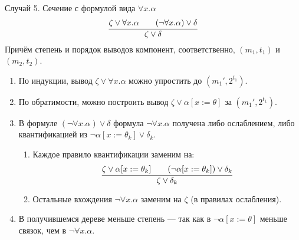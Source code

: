 \documentclass[handout]{beamer}
\begin{document}
\begin{frame}{Случай 5. Сечение с формулой вида $\forall x.\alpha$}
\vspace{-0.1cm}$$\infer{\zeta\vee\delta}{\zeta\vee\forall x.\alpha\quad\quad(\neg\forall x.\alpha)\vee\delta}$$\vspace{-0.1cm}
Причём степень и порядок выводов компонент, соответственно, $(m_1,t_1)$ и $(m_2,t_2)$.\vspace{-0.1cm}
\begin{enumerate}
\item По индукции, вывод $\zeta\vee\forall x.\alpha$ можно упростить до $(m_1',2^{t_1})$.
\item По обратимости, можно построить вывод $\zeta\vee\alpha[x := \theta]$ за $(m_1',2^{t_1})$.
\item В формуле $(\neg \forall x. \alpha)\vee\delta$ формула $\neg\forall x.\alpha$ получена
либо ослаблением, либо квантификацией из $\neg\alpha[x := \theta_k]\vee\delta_k$. 
\begin{enumerate}
\item Каждое правило квантификации заменим на:
$$\infer{\zeta\vee\delta_k}{\zeta\vee\alpha[x := \theta_k]\quad\quad(\neg\alpha[x := \theta_k])\vee\delta_k}$$
\item Остальные вхождения $\neg\forall x.\alpha$ заменим на $\zeta$ (в правилах ослабления).
\end{enumerate}
\item В получившемся дереве меньше степень --- так как в $\neg\alpha[x := \theta]$ меньше связок, чем в $\neg\forall x.\alpha$.
\end{enumerate}
\end{frame}
\end{document}
